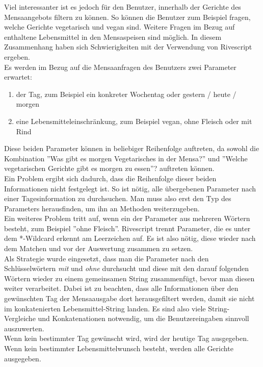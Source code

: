 Viel interessanter ist es jedoch für den Benutzer, innerhalb der Gerichte des Mensaangebots filtern zu können. So können die Benutzer zum Beispiel fragen, welche Gerichte vegetarisch und vegan sind. Weitere Fragen im Bezug auf enthaltene Lebensmittel in den Mensaspeisen sind möglich.
In diesem Zusammenhang haben sich Schwierigkeiten mit der Verwendung von Rivescript ergeben. \\
Es werden im Bezug auf die Mensaanfragen des Benutzers zwei Parameter erwartet:
\begin{enumerate}[noitemsep]
    \item der Tag, zum Beispiel ein konkreter Wochentag oder gestern / heute / morgen
    \item eine Lebensmitteleinschränkung, zum Beispiel vegan, ohne Fleisch oder mit Rind 
\end{enumerate}
Diese beiden Parameter können in beliebiger Reihenfolge auftreten, da sowohl die Kombination 
''Was gibt es morgen Vegetarisches in der Mensa?'' und
''Welche vegetarischen Gerichte gibt es morgen zu essen''?
auftreten können. \\
Ein Problem ergibt sich dadurch, dass die Reihenfolge dieser beiden Informationen nicht festgelegt ist. So ist nötig, alle übergebenen Parameter nach einer Tagesinformation zu durchsuchen. Man muss also erst den Typ des Parameters herausfinden, um ihn an Methoden weiterzugeben. \\
Ein weiteres Problem tritt auf, wenn ein der Parameter aus mehreren Wörtern besteht, zum Beispiel ''ohne Fleisch''. Rivescript trennt Parameter, die es unter dem *-Wildcard erkennt am Leerzeichen auf. Es ist also nötig, diese wieder nach dem Matchen und vor der Auswertung zusammen zu setzen. \\
Als Strategie wurde eingesetzt, dass man die Parameter nach den Schlüsselwörtern \emph{mit} und \emph{ohne} durchsucht und diese mit den darauf folgenden Wörtern wieder zu einem gemeinsamen String zusammenfügt, bevor man diesen weiter verarbeitet. Dabei ist zu beachten, dass alle Informationen über den gewünschten Tag der Mensaausgabe dort herausgefiltert werden, damit sie nicht im konkatenierten Lebensmittel-String landen. Es sind also viele String-Vergleiche und Konkatenationen notwendig, um die Benutzereingaben sinnvoll auszuwerten. \\
Wenn kein bestimmter Tag gewünscht wird, wird der heutige Tag ausgegeben. Wenn kein bestimmter Lebensmittelwunsch besteht, werden alle Gerichte ausgegeben.


